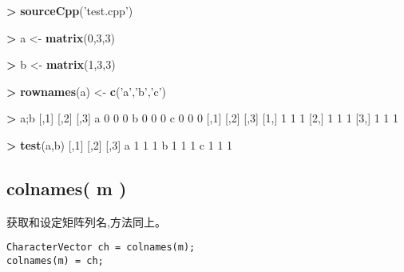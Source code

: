 \documentclass[]{ctexbook}
\newenvironment{Shaded}{\begin{snugshade}}{\end{snugshade}}
\newcommand{\KeywordTok}[1]{\textcolor[rgb]{0.13,0.29,0.53}{\textbf{#1}}}
\newcommand{\DecValTok}[1]{\textcolor[rgb]{0.00,0.00,0.81}{#1}}
\newcommand{\StringTok}[1]{\textcolor[rgb]{0.31,0.60,0.02}{#1}}
\newcommand{\OperatorTok}[1]{\textcolor[rgb]{0.81,0.36,0.00}{\textbf{#1}}}
\newcommand{\NormalTok}[1]{#1}
\begin{document}
\begin{Shaded}
\begin{Highlighting}[]
\OperatorTok{>}\StringTok{ }\KeywordTok{sourceCpp}\NormalTok{(}\StringTok{'test.cpp'}\NormalTok{)}

\OperatorTok{>}\StringTok{ }\NormalTok{a <-}\StringTok{ }\KeywordTok{matrix}\NormalTok{(}\DecValTok{0}\NormalTok{,}\DecValTok{3}\NormalTok{,}\DecValTok{3}\NormalTok{)}

\OperatorTok{>}\StringTok{ }\NormalTok{b <-}\StringTok{ }\KeywordTok{matrix}\NormalTok{(}\DecValTok{1}\NormalTok{,}\DecValTok{3}\NormalTok{,}\DecValTok{3}\NormalTok{)}

\OperatorTok{>}\StringTok{ }\KeywordTok{rownames}\NormalTok{(a) <-}\StringTok{ }\KeywordTok{c}\NormalTok{(}\StringTok{'a'}\NormalTok{,}\StringTok{'b'}\NormalTok{,}\StringTok{'c'}\NormalTok{)}

\OperatorTok{>}\StringTok{ }\NormalTok{a;b}
\NormalTok{  [,}\DecValTok{1}\NormalTok{] [,}\DecValTok{2}\NormalTok{] [,}\DecValTok{3}\NormalTok{]}
\NormalTok{a    }\DecValTok{0}    \DecValTok{0}    \DecValTok{0}
\NormalTok{b    }\DecValTok{0}    \DecValTok{0}    \DecValTok{0}
\NormalTok{c    }\DecValTok{0}    \DecValTok{0}    \DecValTok{0}
\NormalTok{     [,}\DecValTok{1}\NormalTok{] [,}\DecValTok{2}\NormalTok{] [,}\DecValTok{3}\NormalTok{]}
\NormalTok{[}\DecValTok{1}\NormalTok{,]    }\DecValTok{1}    \DecValTok{1}    \DecValTok{1}
\NormalTok{[}\DecValTok{2}\NormalTok{,]    }\DecValTok{1}    \DecValTok{1}    \DecValTok{1}
\NormalTok{[}\DecValTok{3}\NormalTok{,]    }\DecValTok{1}    \DecValTok{1}    \DecValTok{1}

\OperatorTok{>}\StringTok{ }\KeywordTok{test}\NormalTok{(a,b)}
\NormalTok{  [,}\DecValTok{1}\NormalTok{] [,}\DecValTok{2}\NormalTok{] [,}\DecValTok{3}\NormalTok{]}
\NormalTok{a    }\DecValTok{1}    \DecValTok{1}    \DecValTok{1}
\NormalTok{b    }\DecValTok{1}    \DecValTok{1}    \DecValTok{1}
\NormalTok{c    }\DecValTok{1}    \DecValTok{1}    \DecValTok{1}
\end{Highlighting}
\end{Shaded}

\subsection{colnames( m )}\label{colnamesMatrix}

获取和设定矩阵列名,方法同上。

\begin{verbatim}
CharacterVector ch = colnames(m);
colnames(m) = ch;
\end{verbatim}
\end{document}
